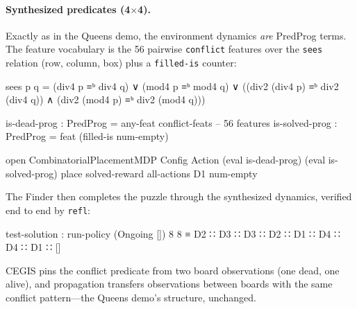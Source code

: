 \documentclass[9pt,a4paper]{article}
\theoremstyle{plain}
\theoremstyle{definition}
\theoremstyle{remark}
\begin{document}
\paragraph{Synthesized predicates (4$\times$4).}  Exactly as in the Queens demo, the environment dynamics \emph{are} PredProg terms.  The feature vocabulary is the 56 pairwise \texttt{conflict} features over the \texttt{sees} relation (row, column, box) plus a \texttt{filled-is} counter:
\begin{spec}
sees p q = (div4 p ≡ᵇ div4 q) ∨ (mod4 p ≡ᵇ mod4 q)
  ∨ ((div2 (div4 p) ≡ᵇ div2 (div4 q)) ∧ (div2 (mod4 p) ≡ᵇ div2 (mod4 q)))

is-dead-prog   : PredProg = any-feat conflict-feats     -- 56 features
is-solved-prog : PredProg = feat (filled-is num-empty)

open CombinatorialPlacementMDP Config Action
  (eval is-dead-prog) (eval is-solved-prog)
  place solved-reward all-actions D1 num-empty
\end{spec}
The Finder then completes the puzzle through the synthesized dynamics, verified end to end by \texttt{refl}:
\begin{spec}
test-solution : run-policy (Ongoing []) 8 8
  ≡ D2 ∷ D3 ∷ D3 ∷ D2 ∷ D1 ∷ D4 ∷ D4 ∷ D1 ∷ []
\end{spec}
CEGIS pins the conflict predicate from two board observations (one dead, one alive), and propagation transfers observations between boards with the same conflict pattern---the Queens demo's structure, unchanged.
\end{document}
